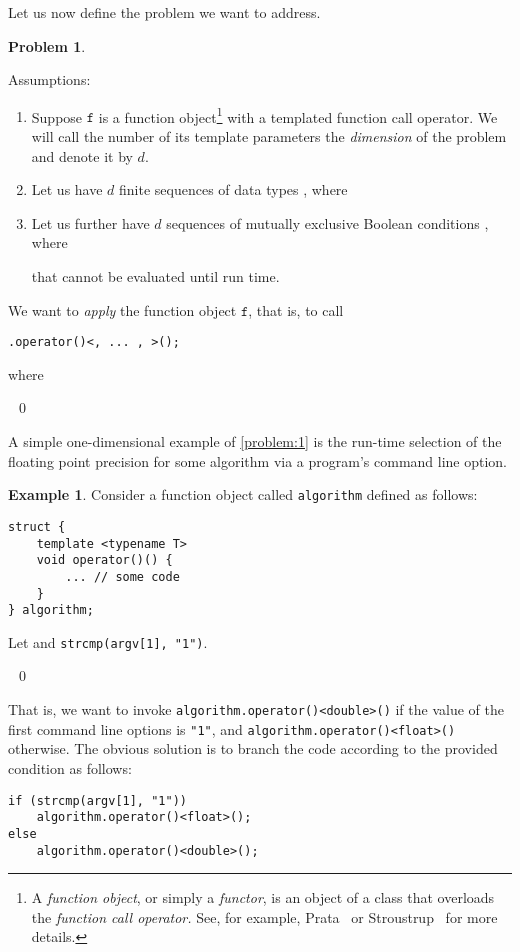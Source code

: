 \documentclass[10pt,a4paper]{article}
\theoremstyle{definition}\newtheorem{problem}{Problem}
\newtheorem{example}{Example}
\providecommand{\symdim}{\ensuremath{d}\xspace}
\providecommand{\symfunctor}{\ensuremath{\mathtt{f}}}
\providecommand{\symfunctorx}{\symfunctor\xspace}
\begin{document}
\noindent
Let us now define the problem we want to address.
\begin{problem}
\label{problem:1}

Assumptions:
\begin{enumerate}
\item Suppose \symfunctorx is a function object\footnote{A \emph{function object}, or simply a \emph{functor}, is an object of a class that overloads the \emph{function call operator.} See, for example, Prata~\cite{RefWorks:81} or Stroustrup~\cite{RefWorks:79} for more details.}
with a templated function call operator. We will call the number of its template parameters the \emph{dimension} of the problem and denote it by \symdim.

\item Let us have \symdim finite sequences of data types , where


\item Let us further have \symdim sequences of mutually exclusive Boolean conditions , where

that cannot be evaluated until run time. 
\end{enumerate}
We want to \emph{apply} the function object \symfunctorx, that is, to call 
\begin{lstlisting}
.operator()<, ... , >();
\end{lstlisting}
where


\vspace{-1.2em} \ \qed
\end{problem}

\vspace{-0.3em}
A simple one-dimensional example of \autoref{problem:1} is the run-time selection of the floating point precision for some algorithm via a program's command line option.

\begin{example}
\label{example:1}
Consider a function object called \texttt{algorithm} defined as follows:{
\begin{lstlisting}
struct {
    template <typename T>
    void operator()() {
        ... // some code
    }
} algorithm;
\end{lstlisting}
}
\noindent
Let  and \verb|strcmp(argv[1], "1")|.

\ \qed
\end{example}
That is, we want to invoke \texttt{algorithm.operator()<double>()} if the value of the first command line options is \texttt{"1"}, and \texttt{algorithm.operator()<float>()} otherwise. The obvious solution is to branch the code according to the provided condition as follows:
\begin{lstlisting}
if (strcmp(argv[1], "1")) 
    algorithm.operator()<float>(); 
else
    algorithm.operator()<double>();
\end{lstlisting}
\end{document}
